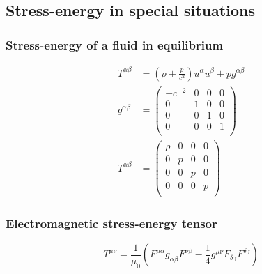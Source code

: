 %
%
\subsection{Stress-energy in special situations}
\subsubsection{Stress-energy of a fluid in equilibrium}
\begin{align}
  T^{\alpha \beta }
    & = \left( \rho + \frac{p}{c^2} \right) u^{\alpha } u^{\beta } + p g^{\alpha \beta } \\
  g^{\alpha \beta }
    & = \left(
      \begin{array}{cccc}
        -{c}^{-2} & 0 & 0 & 0 \\
        0 & 1 & 0 & 0 \\
        0 & 0 & 1 & 0 \\
        0 & 0 & 0 & 1 \\
      \end{array}
    \right) \\
  T^{\alpha \beta }
    & = \left(
      \begin{array}{cccc}
        \rho & 0 & 0 & 0 \\
        0 & p & 0 & 0 \\
        0 & 0 & p & 0 \\
        0 & 0 & 0 & p \\
      \end{array}
    \right)
\end{align}


\subsubsection{Electromagnetic stress-energy tensor}
\begin{equation}
  T^{\mu \nu }
    = \frac{1}{{\mu }_0} \left( F^{\mu \alpha } g_{\alpha \beta } F^{\nu \beta }
        - \frac{1}{4} g^{\mu \nu } F_{\delta \gamma } F^{\delta \gamma } \right)
\end{equation}



%
%
%
%
